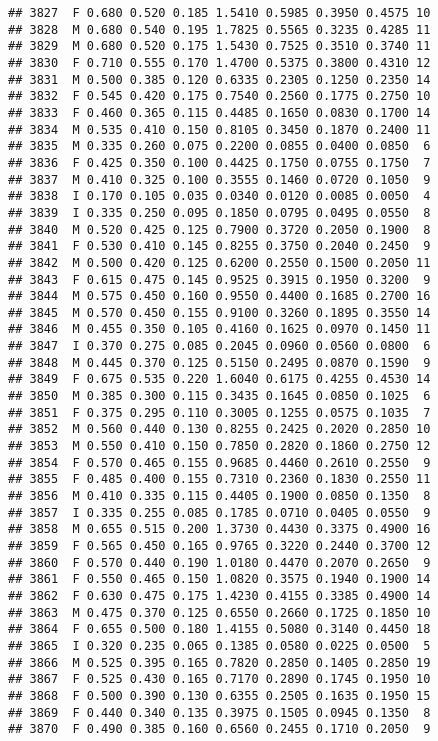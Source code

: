 \documentclass[
]{article}
\begin{document}
\begin{verbatim}
## 3827  F 0.680 0.520 0.185 1.5410 0.5985 0.3950 0.4575 10
## 3828  M 0.680 0.540 0.195 1.7825 0.5565 0.3235 0.4285 11
## 3829  M 0.680 0.520 0.175 1.5430 0.7525 0.3510 0.3740 11
## 3830  F 0.710 0.555 0.170 1.4700 0.5375 0.3800 0.4310 12
## 3831  M 0.500 0.385 0.120 0.6335 0.2305 0.1250 0.2350 14
## 3832  F 0.545 0.420 0.175 0.7540 0.2560 0.1775 0.2750 10
## 3833  F 0.460 0.365 0.115 0.4485 0.1650 0.0830 0.1700 14
## 3834  M 0.535 0.410 0.150 0.8105 0.3450 0.1870 0.2400 11
## 3835  M 0.335 0.260 0.075 0.2200 0.0855 0.0400 0.0850  6
## 3836  F 0.425 0.350 0.100 0.4425 0.1750 0.0755 0.1750  7
## 3837  M 0.410 0.325 0.100 0.3555 0.1460 0.0720 0.1050  9
## 3838  I 0.170 0.105 0.035 0.0340 0.0120 0.0085 0.0050  4
## 3839  I 0.335 0.250 0.095 0.1850 0.0795 0.0495 0.0550  8
## 3840  M 0.520 0.425 0.125 0.7900 0.3720 0.2050 0.1900  8
## 3841  F 0.530 0.410 0.145 0.8255 0.3750 0.2040 0.2450  9
## 3842  M 0.500 0.420 0.125 0.6200 0.2550 0.1500 0.2050 11
## 3843  F 0.615 0.475 0.145 0.9525 0.3915 0.1950 0.3200  9
## 3844  M 0.575 0.450 0.160 0.9550 0.4400 0.1685 0.2700 16
## 3845  M 0.570 0.450 0.155 0.9100 0.3260 0.1895 0.3550 14
## 3846  M 0.455 0.350 0.105 0.4160 0.1625 0.0970 0.1450 11
## 3847  I 0.370 0.275 0.085 0.2045 0.0960 0.0560 0.0800  6
## 3848  M 0.445 0.370 0.125 0.5150 0.2495 0.0870 0.1590  9
## 3849  F 0.675 0.535 0.220 1.6040 0.6175 0.4255 0.4530 14
## 3850  M 0.385 0.300 0.115 0.3435 0.1645 0.0850 0.1025  6
## 3851  F 0.375 0.295 0.110 0.3005 0.1255 0.0575 0.1035  7
## 3852  M 0.560 0.440 0.130 0.8255 0.2425 0.2020 0.2850 10
## 3853  M 0.550 0.410 0.150 0.7850 0.2820 0.1860 0.2750 12
## 3854  F 0.570 0.465 0.155 0.9685 0.4460 0.2610 0.2550  9
## 3855  F 0.485 0.400 0.155 0.7310 0.2360 0.1830 0.2550 11
## 3856  M 0.410 0.335 0.115 0.4405 0.1900 0.0850 0.1350  8
## 3857  I 0.335 0.255 0.085 0.1785 0.0710 0.0405 0.0550  9
## 3858  M 0.655 0.515 0.200 1.3730 0.4430 0.3375 0.4900 16
## 3859  F 0.565 0.450 0.165 0.9765 0.3220 0.2440 0.3700 12
## 3860  F 0.570 0.440 0.190 1.0180 0.4470 0.2070 0.2650  9
## 3861  F 0.550 0.465 0.150 1.0820 0.3575 0.1940 0.1900 14
## 3862  F 0.630 0.475 0.175 1.4230 0.4155 0.3385 0.4900 14
## 3863  M 0.475 0.370 0.125 0.6550 0.2660 0.1725 0.1850 10
## 3864  F 0.655 0.500 0.180 1.4155 0.5080 0.3140 0.4450 18
## 3865  I 0.320 0.235 0.065 0.1385 0.0580 0.0225 0.0500  5
## 3866  M 0.525 0.395 0.165 0.7820 0.2850 0.1405 0.2850 19
## 3867  F 0.525 0.430 0.165 0.7170 0.2890 0.1745 0.1950 10
## 3868  F 0.500 0.390 0.130 0.6355 0.2505 0.1635 0.1950 15
## 3869  F 0.440 0.340 0.135 0.3975 0.1505 0.0945 0.1350  8
## 3870  F 0.490 0.385 0.160 0.6560 0.2455 0.1710 0.2050  9

\end{verbatim}
\end{document}
